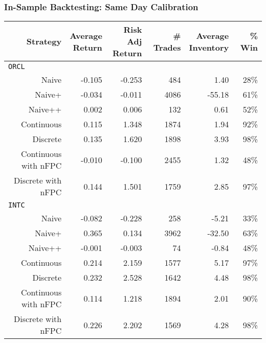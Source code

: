 \begin{frame}
\frametitle{In-Sample Backtesting: Same Day Calibration}
\begin{table}
\centering
{}
\setlength{\tabcolsep}{9pt}
\begin{adjustbox}{width=\textwidth}
\begin{tabular}{@{} *{6}{r} @{}}
\toprule
Strategy & \cellbreak{t}{r}{Average \\ Return} & \cellbreak{t}{r}{Risk Adj \\ Return} & \cellbreak{t}{r}{\# Trades \\ \hphantom{Risk Adj}} & \cellbreak{t}{r}{Average \\ Inventory} & \cellbreak{t}{r}{\% Win \\ \hphantom{Risk Adj}} \\
\midrule
\multicolumn{6}{l}{\texttt{ORCL}} \\
Naive & -0.105 & -0.253 & 484 & 1.40 & 28\%  \\ 
Naive+ & -0.034 & -0.011 & 4086 & -55.18 & 61\% \\ 
Naive++ & 0.002 & 0.006 & 132 & 0.61 & 52\% \\ 
Continuous & 0.115 & 1.348 & 1874 & 1.94 & 92\% \\ 
Discrete & 0.135 & 1.620 & 1898 & 3.93 & 98\% \\ 
Continuous with nFPC & -0.010 & -0.100 & 2455 & 1.32 & 48\% \\ 
Discrete with nFPC & 0.144 & 1.501 & 1759 & 2.85 & 97\% \\[2ex]
\multicolumn{6}{l}{\texttt{INTC}} \\
Naive & -0.082 & -0.228 & 258 & -5.21 & 33\% \\ 
Naive+ & 0.365 & 0.134 & 3962 & -32.50 & 63\% \\ 
Naive++ & -0.001 & -0.003 & 74 & -0.84 & 48\% \\ 
Continuous & 0.214 & 2.159 & 1577 & 5.17 & 97\% \\ 
Discrete & 0.232 & 2.528 & 1642 & 4.48 & 98\% \\ 
Continuous with nFPC & 0.114 & 1.218 & 1894 & 2.01 & 90\% \\ 
Discrete with nFPC &  0.226 & 2.202 & 1569 & 4.28 & 98\% \\ 
\bottomrule
\end{tabular}
\end{adjustbox}
\end{table}
\end{frame}

